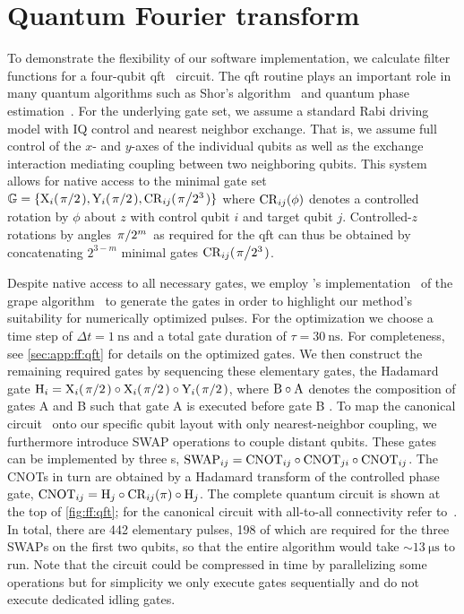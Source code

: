 \section{Quantum Fourier transform}\label{sec:ff:examples:qft}
To demonstrate the flexibility of our software implementation, we calculate filter functions for a four-qubit \acrfull{qft}~\cite{Coppersmith1994,Nielsen2011} circuit.
The \gls{qft} routine plays an important role in many quantum algorithms such as Shor's algorithm~\cite{Shor1997} and quantum phase estimation~\cite{Nielsen2011}.
For the underlying gate set, we assume a standard Rabi driving model with IQ control and nearest neighbor exchange.
That is, we assume full control of the $x$- and $y$-axes of the individual qubits as well as the exchange interaction mediating coupling between two neighboring qubits.
This system allows for native access to the minimal gate set $\mathbb{G} = \lbrace\mr{X}_{i}(\flatfrac{\pi}{2}),\mr{Y}_{i}(\flatfrac{\pi}{2}),\mr{CR}_{ij}(\flatfrac{\pi}{2^3})\rbrace$ where $\mathrm{CR}_{ij}(\phi)$ denotes a controlled rotation by $\phi$ about $z$ with control qubit $i$ and target qubit $j$.
Controlled-$z$ rotations by angles $\flatfrac{\pi}{2^m}$ as required for the \gls{qft} can thus be obtained by concatenating $2^{3-m}$ minimal gates $\mr{CR}_{ij}(\flatfrac{\pi}{2^3})$.

Despite native access to all necessary gates, we employ \qutip's implementation~\cite{Johansson2012} of the \gls{grape} algorithm~\cite{Khaneja2005,Schulte-Herbruggen2005} to generate the gates in order to highlight our method's suitability for numerically optimized pulses.
For the optimization we choose a time step of $\Delta t = \qty{1}{\nano\second}$ and a total gate duration of $\tau = \qty{30}{\nano\second}$.
For completeness, see \cref{sec:app:ff:qft} for details on the optimized gates.
We then construct the remaining required gates by sequencing these elementary gates, \ie the Hadamard gate $\mr{H}_i = \mr{X}_{i}(\flatfrac{\pi}{2})\circ\mr{X}_{i}(\flatfrac{\pi}{2})\circ\mr{Y}_{i}(\flatfrac{\pi}{2})$, where $\mathrm{B}\circ\mathrm{A}$ denotes the composition of gates A and B such that gate A is executed before gate B .
To map the canonical circuit~\cite{Nielsen2011} onto our specific qubit layout with only nearest-neighbor coupling, we furthermore introduce SWAP operations to couple distant qubits.
These gates can be implemented by three s, $\mathrm{SWAP}_{ij} = \mathrm{CNOT}_{ij}\circ\mathrm{CNOT}_{ji}\circ\mathrm{CNOT}_{ij}$.
The CNOTs in turn are obtained by a Hadamard transform of the controlled phase gate, $\mathrm{CNOT}_{ij} = \mathrm{H}_j\circ\mathrm{CR}_{ij}(\pi)\circ\mathrm{H}_j$.
The complete quantum circuit is shown at the top of \cref{fig:ff:qft}; for the canonical circuit with all-to-all connectivity refer to~.
In total, there are \num{442} elementary pulses, \num{198} of which are required for the three SWAPs on the first two qubits, so that the entire algorithm would take $\sim\qty{13}{\micro\second}$ to run.
Note that the circuit could be compressed in time by parallelizing some operations but for simplicity we only execute gates sequentially and do not execute dedicated idling gates.

